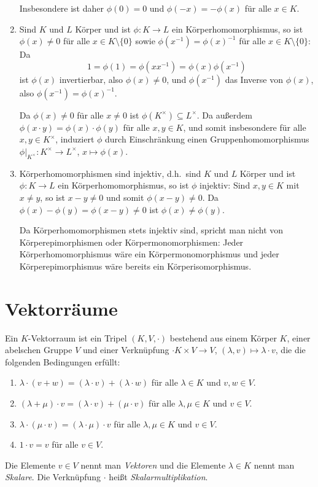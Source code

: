 \begin{bem}
\begin{enumerate}[leftmargin=*]
   Insbesondere ist daher $\phi(0) = 0$ und $\phi(-x) = -\phi(x)$ für alle $x \in K$.
  \item
   Sind $K$ und $L$ Körper und ist $\phi \colon K \to L$ ein Körperhomomorphismus, so ist $\phi(x) \neq 0$ für alle $x \in K \setminus \{0\}$ sowie $\phi(x^{-1}) = \phi(x)^{-1}$ für alle $x \in K \setminus \{0\}$: Da
   \[
    1 = \phi(1) = \phi(x x^{-1}) = \phi(x) \phi(x^{-1})
   \]
   ist $\phi(x)$ invertierbar, also $\phi(x) \neq 0$, und $\phi(x^{-1})$ das Inverse von $\phi(x)$, also $\phi(x^{-1}) = \phi(x)^{-1}$.
   
   Da $\phi(x) \neq 0$ für alle $x \neq 0$ ist $\phi(K^\times) \subseteq L^\times$. Da außerdem $\phi(x \cdot y) = \phi(x) \cdot \phi(y)$ für alle $x,y \in K$, und somit insbesondere für alle $x,y \in K^\times$, induziert $\phi$ durch Einschränkung einen Gruppenhomomorphismus $\phi|_{K^\times} \colon K^\times \to L^\times$, $x \mapsto \phi(x)$.
  \item
   Körperhomomorphismen sind injektiv, d.h.\ sind $K$ und $L$ Körper und ist $\phi \colon K \to L$ ein Körperhomomorphismus, so ist $\phi$ injektiv: Sind $x, y \in K$ mit $x \neq y$, so ist $x-y \neq 0$ und somit $\phi(x-y) \neq 0$. Da $\phi(x)-\phi(y) = \phi(x-y) \neq 0$ ist $\phi(x) \neq \phi(y)$.
   
   Da Körperhomomorphismen stets injektiv sind, spricht man nicht von Körperepimorphismen oder Körpermonomorphismen: Jeder Körperhomomorphismus wäre ein Körpermonomorphismus und jeder Körperepimorphismus wäre bereits ein Körperisomorphismus.
 \end{enumerate}
\end{bem}





\section{Vektorräume}


\begin{defi}
 Ein $K$-Vektorraum ist ein Tripel $(K,V,\cdot)$ bestehend aus einem Körper $K$, einer abelschen Gruppe $V$ und einer Verknüpfung $\cdot K \times V \to V$, $(\lambda, v) \mapsto \lambda \cdot v$, die die folgenden Bedingungen erfüllt:
 \begin{enumerate}[label=\roman*)]
  \item
   $\lambda \cdot (v+w) = (\lambda \cdot v) + (\lambda \cdot w)$ für alle $\lambda \in K$ und $v,w \in V$.
  \item
   $(\lambda + \mu) \cdot v = (\lambda \cdot v) + (\mu \cdot v)$ für alle $\lambda, \mu \in K$ und $v \in V$.
  \item
   $\lambda \cdot (\mu \cdot v) = (\lambda \cdot \mu) \cdot v$ für alle $\lambda, \mu \in K$ und $v \in V$.
  \item
   $1 \cdot v = v$ für alle $v \in V$.
 \end{enumerate}
 Die Elemente $v \in V$ nennt man \emph{Vektoren} und die Elemente $\lambda \in K$ nennt man \emph{Skalare}. Die Verknüpfung $\cdot$ heißt \emph{Skalarmultiplikation}.
\end{defi}


